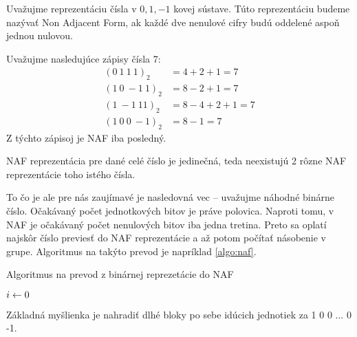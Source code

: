 \begin{definicia}
    Uvažujme reprezentáciu čísla v $0,1,-1$ kovej sústave.
    Túto reprezentáciu budeme nazývať Non Adjacent Form, ak každé dve
    nenulové cifry budú oddelené aspoň jednou nulovou.
\end{definicia}

\begin{priklad}
    Uvažujme nasledujúce zápisy čísla 7:
    \begin{align*}
        (0\ 1\ 1\ 1)_2 &= 4+2+1=7 \\
        (1\ 0\ -1\ 1)_2 &= 8-2+1=7 \\
        (1\ -1\ 1 1)_2 &= 8-4+2+1=7 \\
        (1\ 0\ 0\ -1)_2 &= 8-1=7
    \end{align*}
    Z týchto zápisoj je NAF iba posledný.
\end{priklad}

\begin{poznamka}
    NAF reprezentácia pre dané celé číslo je jedinečná, teda
    neexistujú 2 rôzne NAF reprezentácie toho istého čísla.
\end{poznamka}

To čo je ale pre nás zaujímavé je nasledovná vec -- uvažujme náhodné
binárne číslo. Očakávaný počet jednotkových bitov je práve polovica.
Naproti tomu, v NAF je očakávaný počet nenulových bitov iba jedna
tretina. Preto sa oplatí najskôr číslo previesť do NAF reprezentácie a
až potom počítať násobenie v grupe. Algoritmus na takýto prevod je
napríklad \ref{algo:naf}.

\begin{algorithm}[H]
    \caption{Algoritmus na prevod z binárnej reprezetácie do NAF}
    \label{algo:naf}
    $i \leftarrow 0$\;
\end{algorithm}

Základná myšlienka je nahradiť dlhé bloky po sebe idúcich jednotiek za
1 0 0 ... 0 -1.

